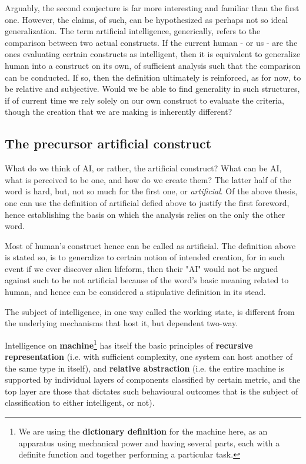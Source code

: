 Arguably, the second conjecture is far more interesting and familiar than the first one. However, the claims, of such, can be hypothesized as perhaps not so ideal generalization. The term artificial intelligence, generically, refers to the comparison between two actual constructs. If the current human - or us - are the ones evaluating certain constructs as intelligent, then it is equivalent to generalize human into a construct on its own, of sufficient analysis such that the comparison can be conducted. If so, then the definition ultimately is reinforced, as for now, to be relative and subjective. Would we be able to find generality in such structures, if of current time we rely solely on our own construct to evaluate the criteria, though the creation that we are making is inherently different?

\subsection{The precursor artificial construct}

What do we think of AI, or rather, the artificial construct? What can be AI, what is perceived to be one, and how do we create them? The latter half of the word is hard, but, not so much for the first one, or \textit{artificial}. Of the above thesis, one can use the definition of artificial defied above to justify the first foreword, hence establishing the basis on which the analysis relies on the only the other word. 

Most of human's construct hence can be called as artificial. The definition above is stated so, is to generalize to certain notion of intended creation, for in such event if we ever discover alien lifeform, then their "AI" would not be argued against such to be not artificial because of the word's basic meaning related to human, and hence can be considered a stipulative definition in its stead. 

\begin{hypothesis}
    The subject of intelligence, in one way called the working state, is different from the underlying mechanisms that host it, but dependent two-way.
\end{hypothesis}

\begin{hypothesis}
    Intelligence on \textbf{machine}\footnote{We are using the \textbf{dictionary definition} for the machine here, as an apparatus using mechanical power and having several parts, each with a definite function and together performing a particular task.} has itself the basic principles of \textbf{recursive representation} (i.e. with sufficient complexity, one system can host another of the same type in itself), and \textbf{relative abstraction} (i.e. the entire machine is supported by individual layers of components classified by certain metric, and the top layer are those that dictates such behavioural outcomes that is the subject of classification to either intelligent, or not).
\end{hypothesis}

